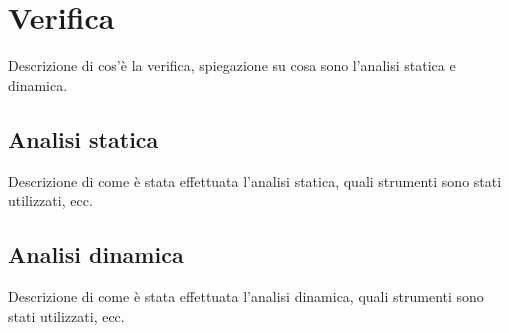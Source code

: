 \section{Verifica}
\label{sez:verifica}

Descrizione di cos'è la verifica, spiegazione su cosa sono l'analisi statica e dinamica.\\

\subsection{Analisi statica}
\label{subsec:analisi-statica}

Descrizione di come è stata effettuata l'analisi statica, quali strumenti sono stati utilizzati, ecc.\\

\subsection{Analisi dinamica}
\label{subsec:analisi-dinamica}

Descrizione di come è stata effettuata l'analisi dinamica, quali strumenti sono stati utilizzati, ecc.\\